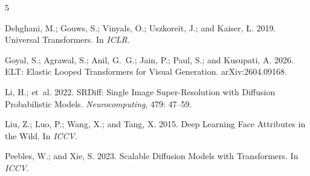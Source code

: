 \begin{thebibliography}{5}

Dehghani, M.; Gouws, S.; Vinyals, O.; Uszkoreit, J.; and Kaiser, {\L}. 2019.
\newblock Universal Transformers.
\newblock In \emph{ICLR}.

Goyal, S.; Agrawal, S.; Anil, G.~G.; Jain, P.; Paul, S.; and Kusupati, A. 2026.
\newblock ELT: Elastic Looped Transformers for Visual Generation.
\newblock arXiv:2604.09168.

Li, H.; et~al. 2022.
\newblock SRDiff: Single Image Super-Resolution with Diffusion Probabilistic Models.
\newblock \emph{Neurocomputing}, 479: 47--59.

Liu, Z.; Luo, P.; Wang, X.; and Tang, X. 2015.
\newblock Deep Learning Face Attributes in the Wild.
\newblock In \emph{ICCV}.

Peebles, W.; and Xie, S. 2023.
\newblock Scalable Diffusion Models with Transformers.
\newblock In \emph{ICCV}.

\end{thebibliography}
